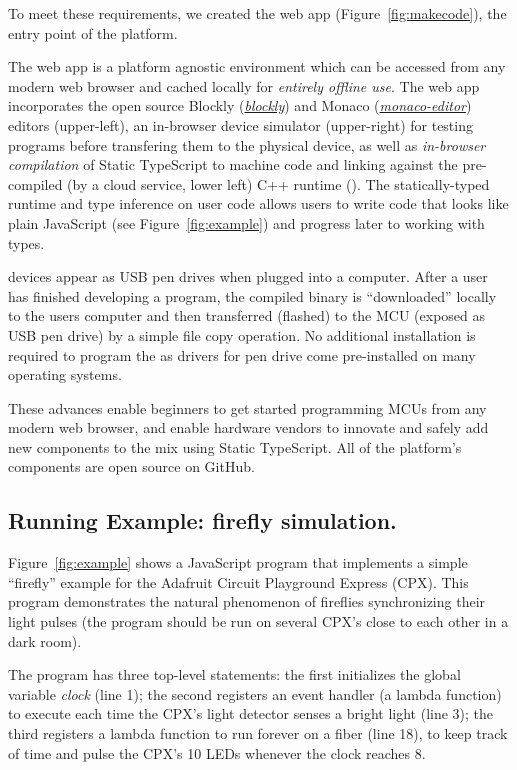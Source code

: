 To meet these requirements, we created the \MC web app (Figure~\ref{fig:makecode}), the entry point of the platform.

The \MC web app is a platform agnostic environment which can be accessed from any modern web browser and cached locally for \emph{entirely offline use}. The \MC web app incorporates the open source Blockly (\emph{\href{https://github.com/google/blockly}{blockly}}) and Monaco (\emph{\href{https://github.com/Microsoft/monaco-editor}{monaco-editor}}) editors (upper-left), an in-browser device simulator (upper-right) for testing programs before transfering them to the physical device, as well as \emph{in-browser compilation} of Static TypeScript to machine code and linking against the pre-compiled (by a cloud service, lower left) C++ runtime (\emph{\CON}). The statically-typed runtime and type inference on user code allows users to write code that looks like plain JavaScript (see Figure~\ref{fig:example}) and progress later to working with types.

\MC devices appear as USB pen drives when plugged into a computer. After a user has finished developing a program, the compiled binary is ``downloaded'' locally to the users computer and then transferred (flashed) to the MCU (exposed as USB pen drive) by a simple file copy operation. No additional installation is required to program the \MCU as drivers for pen drive come pre-installed on many operating systems.

These advances enable beginners to get started programming MCUs from any modern web browser, and enable hardware vendors to innovate and safely add new components to the mix using Static TypeScript. All of the platform's components are open source on GitHub.

\subsection{Running Example: firefly simulation.}

Figure~\ref{fig:example} shows a JavaScript
program that implements a simple ``firefly'' example
for the Adafruit Circuit Playground Express (CPX).
This program demonstrates the natural phenomenon
of fireflies synchronizing their light pulses (the program should be
run on several CPX's close to each other in a dark room).

The program has three top-level statements:
the first initializes the global variable \emph{clock} (line 1); the
second registers an event handler (a lambda function) to execute
each time the CPX's light detector senses a bright light (line 3); the
third registers a lambda function to run forever on a fiber (line 18),
to keep track of time and pulse the CPX's 10 LEDs whenever the
clock reaches 8.

